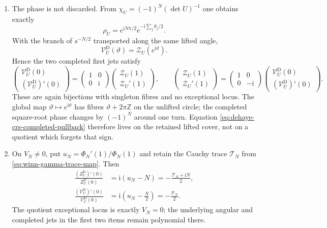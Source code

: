 \begin{theorem}
\begin{enumerate}
 \item The phase is not discarded.  From
 $\chi_U=(-1)^N(\det U)^{-1}$ one obtains exactly
 \[
  \rho_U=e^{\mathrm iN\pi/2}e^{-\mathrm i\sum_j\theta_j/2}.
 \]
 With the branch of $s^{-N/2}$ transported along the same lifted angle,
 \begin{equation}
  \mathcal V_U^{\mathrm D}(\vartheta)
  =\mathcal Z_U(e^{\mathrm i\vartheta}).
  \label{eq:dehaye-crs-completed-pullback}
 \end{equation}
 Hence the two completed first jets satisfy
 \begin{equation}
  \begin{pmatrix}\mathcal V_U^{\mathrm D}(0)\\
  (\mathcal V_U^{\mathrm D})'(0)\end{pmatrix}
  =\begin{pmatrix}1&0\\0&\mathrm i\end{pmatrix}
  \begin{pmatrix}\mathcal Z_U(1)\\\mathcal Z_U'(1)\end{pmatrix},
  \qquad
  \begin{pmatrix}\mathcal Z_U(1)\\\mathcal Z_U'(1)\end{pmatrix}
  =\begin{pmatrix}1&0\\0&-\mathrm i\end{pmatrix}
  \begin{pmatrix}\mathcal V_U^{\mathrm D}(0)\\
  (\mathcal V_U^{\mathrm D})'(0)\end{pmatrix}.
  \label{eq:dehaye-completed-jet-bijection}
 \end{equation}
 These are again bijections with singleton fibres and no exceptional locus.  The
 global map $\vartheta\mapsto e^{\mathrm i\vartheta}$ has fibres
 $\vartheta+2\pi\mathbb Z$ on the unlifted circle; the completed square-root phase
 changes by $(-1)^N$ around one turn.  Equation
 \eqref{eq:dehaye-crs-completed-pullback} therefore lives on the retained lifted
 cover, not on a quotient which forgets that sign.

 \item On $V_N\ne0$, put $u_N=\Phi_N'(1)/\Phi_N(1)$ and retain the
 Cauchy trace $\mathcal T_N$ from \eqref{eq:winn-gamma-trace-map}.  Then
 \begin{align}
  \frac{(Z_U^{\mathrm D})'(0)}{Z_U^{\mathrm D}(0)}
  &=\mathrm i(u_N-N)=-\frac{\mathcal T_N+\mathrm iN}{2},
  \label{eq:dehaye-uncompleted-log-trace}\\
  \frac{(\mathcal V_U^{\mathrm D})'(0)}{\mathcal V_U^{\mathrm D}(0)}
  &=\mathrm i\left(u_N-\frac N2\right)=-\frac{\mathcal T_N}{2}.
  \label{eq:dehaye-completed-log-trace}
 \end{align}
 The quotient exceptional locus is exactly $V_N=0$; the underlying angular and
 completed jets in the first two items remain polynomial there.


\end{enumerate}
\end{theorem}
